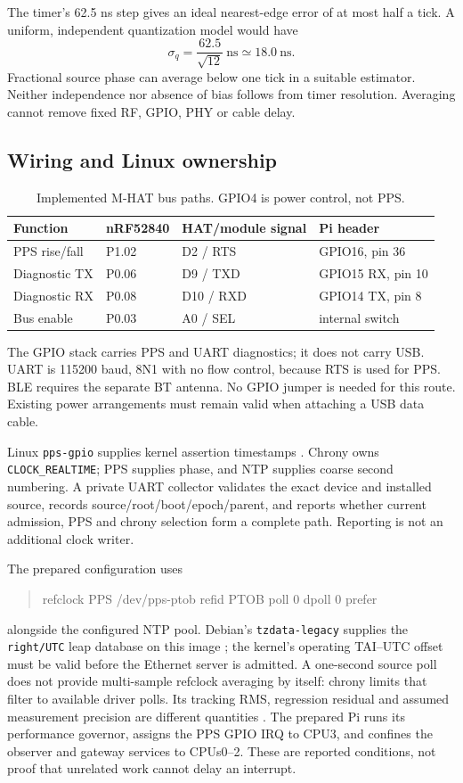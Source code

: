 \documentclass[10pt,letterpaper]{article}
\newcommand{\code}[1]{\texttt{\small #1}}
\newcommand{\ns}{\ensuremath{\mathrm{ns}}}
\begin{document}
The timer's 62.5 ns step gives an ideal nearest-edge error of at most half a
tick. A uniform, independent quantization model would have
\[
 \sigma_q=\frac{62.5}{\sqrt{12}}\ \ns \simeq18.0\ \ns .
\]
Fractional source phase can average below one tick in a suitable estimator.
Neither independence nor absence of bias follows from timer resolution.
Averaging cannot remove fixed RF, GPIO, PHY or cable delay.

\subsection{Wiring and Linux ownership}
\begin{table}[ht]
\centering\small
\caption{Implemented M-HAT bus paths. GPIO4 is power control, not PPS.}
\begin{tabular}{llll}
\toprule Function & nRF52840 & HAT/module signal & Pi header\\
\midrule
PPS rise/fall & P1.02 & D2 / RTS & GPIO16, pin 36\\
Diagnostic TX & P0.06 & D9 / TXD & GPIO15 RX, pin 10\\
Diagnostic RX & P0.08 & D10 / RXD & GPIO14 TX, pin 8\\
Bus enable & P0.03 & A0 / SEL & internal switch\\
\bottomrule
\end{tabular}
\end{table}
The GPIO stack carries PPS and UART diagnostics; it does not carry USB.
UART is 115200 baud, 8N1 with no flow control, because RTS is used for PPS.
BLE requires the separate BT antenna. No GPIO jumper is needed for this route.
Existing power arrangements must remain valid when attaching a USB data cable.

Linux \code{pps-gpio} supplies kernel assertion timestamps
\cite{linuxpps,ppsgpio}. Chrony owns \code{CLOCK\_REALTIME}; PPS supplies phase,
and NTP supplies coarse second numbering. A private UART collector validates
the exact device and installed source, records source/root/boot/epoch/parent,
and reports whether current admission, PPS and chrony selection form a complete
path. Reporting is not an additional clock writer.

The prepared configuration uses
\begin{quote}\small\ttfamily
refclock PPS /dev/pps-ptob refid PTOB poll 0 dpoll 0 prefer
\end{quote}
alongside the configured NTP pool. Debian's \code{tzdata-legacy} supplies the
\code{right/UTC} leap database on this image \cite{debiantz}; the kernel's operating
TAI--UTC offset must be valid before the Ethernet server is admitted.
A one-second source poll does not provide
multi-sample refclock averaging by itself: chrony limits that filter to available
driver polls. Its tracking RMS, regression residual and assumed measurement
precision are different quantities \cite{chrony}. The prepared Pi runs its
performance governor, assigns the PPS GPIO IRQ to CPU3, and confines the
observer and gateway services to CPUs0--2. These are reported conditions, not
proof that unrelated work cannot delay an interrupt.
\end{document}
